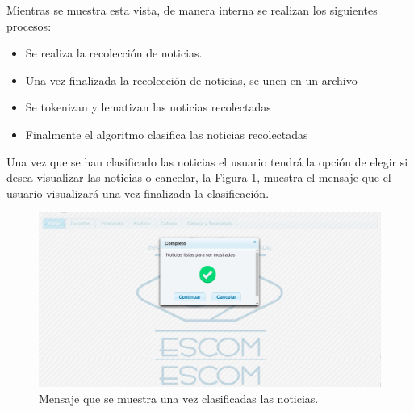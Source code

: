 Mientras se muestra esta vista, de manera interna se realizan los siguientes procesos:

\begin{itemize}
	\item Se realiza la recolección de noticias.  
	\item Una vez finalizada la recolección de noticias, se unen en un archivo
	\item Se tokenizan y lematizan las noticias recolectadas
	\item Finalmente el algoritmo clasifica las noticias recolectadas
\end{itemize}

Una vez que se han clasificado las noticias el usuario tendrá la opción de elegir si desea visualizar las noticias o cancelar, la Figura \ref{fig:notClass}, muestra el mensaje que el usuario visualizará una vez finalizada la clasificación.
\\
\begin{figure}[H]
\centering
\includegraphics[scale=0.29]{imagenes/Capitulo5/noticiasListasParaSerMostradas.png}
\caption{Mensaje que se muestra una vez clasificadas las noticias.}
\label{fig:notClass}
\end{figure}


